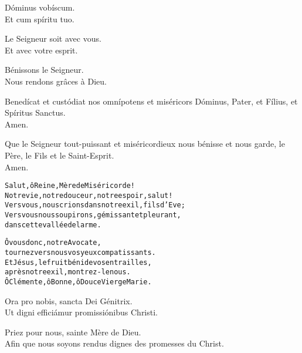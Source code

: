 \documentclass[twoside]{article}
\begin{document}
\begin{paracol}[1]{2}
\switchcolumn*

\vv Dóminus vobíscum. \\
\rr Et cum spíritu tuo.


\switchcolumn

\vv Le Seigneur soit avec vous. \\
\rr Et avec votre esprit.

\vv Bénissons le Seigneur. \\
\rr Nous rendons grâces à Dieu.

\switchcolumn*

\vv Benedícat et custódiat nos omnípotens et miséricors Dóminus, \cc Pater, et Fílius, et Spíritus Sanctus.\\
\rr Amen.

\switchcolumn

\vv Que le Seigneur tout-puissant et miséricordieux nous bénisse et nous garde, \cc le Père, le Fils et le Saint-Esprit. \\
\rr Amen.

\switchcolumn*


\switchcolumn \newpage
\begin{alltt}\normalfont





             Salut, ô Reine, Mère de Miséricorde !
             Notre vie, notre douceur, notre espoir, salut !
             Vers vous, nous crions dans notre exil, fils d’Eve ;
             Vers vous nous soupirons, gémissant et pleurant,
             dans cette vallée de larme.


             Ô vous donc, notre Avocate,
             tournez vers nous vos yeux compatissants.
             Et Jésus, le fruit béni de vos entrailles,
             après notre exil, montrez-le nous.
             Ô Clémente, ô Bonne, ô Douce Vierge Marie.
\end{alltt}
\switchcolumn*

\vv Ora pro nobis, sancta Dei Génitrix.\\
\rr Ut digni efficiámur promissiónibus Christi.

\switchcolumn

\vv Priez pour nous, sainte Mère de Dieu.\\
\rr Afin que nous soyons rendus dignes des promesses du Christ.

\switchcolumn*


\end{paracol}
\end{document}
